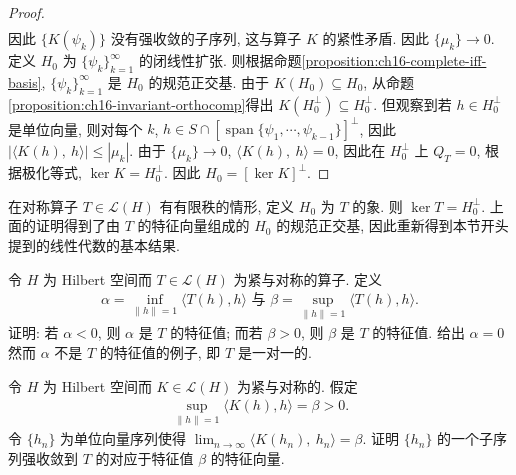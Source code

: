 \documentclass[../../main.tex]{subfiles}
\begin{document}
\begin{proof}
\begin{align*}
\end{align*}
因此 $\{K(\psi_{k})\}$ 没有强收敛的子序列, 这与算子 $K$ 的紧性矛盾. 因此 $\{\mu_{k}\}\to 0$. 定义 $H_{0}$ 为 $\{\psi_{k}\}_{k=1}^{\infty}$ 的闭线性扩张. 则根据命题\cref{proposition:ch16-complete-iff-basis}, $\{\psi_{k}\}_{k=1}^{\infty}$ 是 $H_{0}$ 的规范正交基. 由于 $K(H_{0})\subseteq H_{0}$, 从命题\cref{proposition:ch16-invariant-orthocomp}得出 $K(H_{0}^{\perp})\subseteq H_{0}^{\perp}$. 但观察到若 $h\in H_{0}^{\perp}$ 是单位向量, 则对每个 $k$, $h\in S\cap[\operatorname{span}\{\psi_{1},\cdots,\psi_{k-1}\}]^{\perp}$, 因此 $|\langle K(h),\ h\rangle|\leqslant|\mu_{k}|$. 由于 $\{\mu_{k}\}\to 0$, $\langle K(h),\ h\rangle=0$, 因此在 $H_{0}^{\perp}$ 上 $Q_{T}=0$, 根据极化等式, $\ker K=H_{0}^{\perp}$. 因此 $H_{0}=[\ker K]^{\perp}$.
\end{proof}

在对称算子 $T\in\mathcal{L}(H)$ 有有限秩的情形, 定义 $H_{0}$ 为 $T$ 的象. 则 $\ker T=H_{0}^{\perp}$. 上面的证明得到了由 $T$ 的特征向量组成的 $H_{0}$ 的规范正交基, 因此重新得到本节开头提到的线性代数的基本结果.

\begin{exercise}\label{exercise:ch16-51}
令 $H$ 为 Hilbert 空间而 $T\in\mathcal{L}(H)$ 为紧与对称的算子. 定义
\begin{align*}
\alpha=\inf_{\|h\|=1}\langle T(h),h\rangle\text{ 与 }\beta=\sup_{\|h\|=1}\langle T(h),h\rangle.
\end{align*}
证明: 若 $\alpha<0$, 则 $\alpha$ 是 $T$ 的特征值; 而若 $\beta>0$, 则 $\beta$ 是 $T$ 的特征值. 给出 $\alpha=0$ 然而 $\alpha$ 不是 $T$ 的特征值的例子, 即 $T$ 是一对一的.
\end{exercise}

\begin{exercise}\label{exercise:ch16-52}
令 $H$ 为 Hilbert 空间而 $K\in\mathcal{L}(H)$ 为紧与对称的. 假定
\begin{align*}
\sup_{\|h\|=1}\langle K(h),h\rangle=\beta>0.
\end{align*}
令 $\{h_{n}\}$ 为单位向量序列使得 $\lim_{n\to\infty}\langle K(h_{n}),\ h_{n}\rangle=\beta$. 证明 $\{h_{n}\}$ 的一个子序列强收敛到 $T$ 的对应于特征值 $\beta$ 的特征向量.
\end{exercise}
\end{document}
